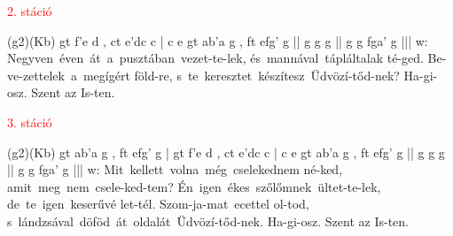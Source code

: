 \documentclass[twoside]{article}
\begin{document}
\textcolor{red}{2. stáció}

\begin{aretino}
(g2)(Kb) gt f'e d , ct e'dc c | c e gt ab'a g , ft efg' g || g g g || g g fga' g |||
w: Negyven~éven~át~a~pusztában~vezet-te-lek, és~mannával~tápláltalak té-ged. Be-ve-zettelek~a~megígért föld-re, s~te~keresztet~készítesz~Üdvözí-tőd-nek? Ha-gi-osz. Szent az Is-ten.
\end{aretino}

\textcolor{red}{3. stáció}

\begin{aretino}
(g2)(Kb) gt ab'a g , ft efg' g | gt f'e d , ct e'dc c | c e gt ab'a g , ft efg' g || g g g || g g fga' g |||
w: Mit~kellett~volna~még~cselekednem né-ked, amit~meg~nem~csele-ked-tem? Én~igen~ékes~szőlőmnek~ültet-te-lek, de~te~igen~keserűvé let-tél. Szom-ja-mat~ecettel ol-tod, s~lándzsával~döföd~át~oldalát~Üdvözí-tőd-nek. Ha-gi-osz. Szent az Is-ten.
\end{aretino}






\end{document}
